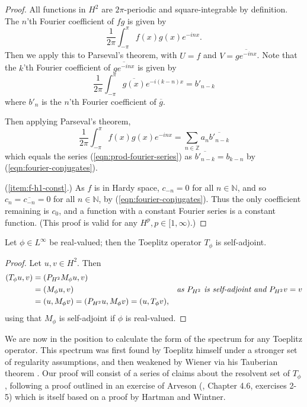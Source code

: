 \documentclass[../main.tex]{subfiles}
\begin{document}
\begin{proof}
  All functions in $H^2$ are $2\pi$-periodic and square-integrable by definition.
  The $n$'th Fourier coefficient of $fg$ is given by
  $$\frac{1}{2\pi} \int_{-\pi}^{\pi} f(x) g(x) e^{-inx}.$$
  Then we apply this to Parseval's theorem, with $U = f$ and $V = \overline{g e^{-inx}}$.
  Note that the $k$'th Fourier coefficient of $\overline{g e^{-inx}}$ is given by
  $$\frac{1}{2\pi} \int_{-\pi}^{\pi} \overline{g(x)} e^{-i(k-n)x} = b'_{n-k}$$
  where $b'_n$ is the $n$'th Fourier coefficient of $\overline{g}$.

  Then applying Parseval's theorem,
  $$\frac{1}{2\pi} \int_{-\pi}^{\pi} f(x) g(x) e^{-inx} = \sum_{n \in \mathbb{Z}}a_n \overline{b'_{n-k}}$$
  which equals the series (\ref{eqn:prod-fourier-series}) as $\overline{b'_{n-k}} = b_{k-n}$ by (\ref{eqn:fourier-conjugates}).


(\ref{item:f-h1-const}.) As $f$ is in Hardy space, $c_{-n} = 0$ for all $n \in \mathbb{N}$, and so $c_n =
  \overline{c_{-n}} = 0$ for all $n \in \mathbb{N}$, by (\ref{eqn:fourier-conjugates}).
  Thus the only coefficient remaining is $c_0$, and a function with a constant Fourier series
  is a constant function. (This proof is valid for any $H^p, p \in [1, \infty)$.)
\end{proof}

\begin{lemma}
\label{thm:toeplitz-self-adjoint}
  Let $\phi \in L^\infty$ be real-valued; then the Toeplitz operator $T_\phi$ is self-adjoint. 
\end{lemma}
\begin{proof}
Let $u, v \in H^2$. Then 
\begin{align*}
(T_\phi u, v) & = ( P_{H^2}M_\phi u, v) & \\
& = (M_\phi u, v) & \text{\emph{as $P_{H^2}$ is self-adjoint and $P_{H^2}v = v$}}\\
& = (u, M_\phi v) = (P_{H^2}u, M_\phi v) = (u, T_\phi v),
\end{align*}
using that $M_\phi$ is self-adjoint if $\phi$ is real-valued.
\end{proof}

We are now in the position to calculate the form of the spectrum for any
Toeplitz operator. This spectrum was first found by Toeplitz himself under a
stronger set of regularity assumptions, and then weakened by Wiener via his
Tauberian theorem \parencite{schmidt1960toeplitz}.
Our proof will consist of a series of claims about the resolvent set of
$T_\phi$, following a proof outlined in an exercise of Arveson
(\parencite{arveson2002short}, Chapter 4.6, exercises 2-5) which is itself based
on a proof by Hartman and Wintner.
\end{document}
